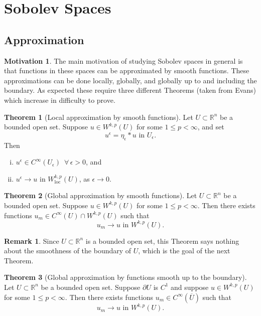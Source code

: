 \documentclass[11pt]{article}
\theoremstyle{definition}
\newtheorem*{theorem}{Theorem}
\newtheorem*{remark}{Remark}
\newtheorem*{motivation}{Motivation}
\begin{document}
\newpage

\section{Sobolev Spaces}

\newpage

\subsection{Approximation}
\begin{motivation}
The main motivation of studying Sobolev spaces in general is that functions in these spaces can be approximated by smooth functions.
These approximations can be done locally, globally, and globally up to and including the boundary.
As expected these require three different Theorems (taken from Evans) which increase in difficulty to prove.
\end{motivation}

\begin{theorem}[Local approximation by smooth functions]
Let $U \subset \mathbb{R}^n$ be a bounded open set. Suppose $u \in W^{k,p}(U)$ for some $1 \leq p < \infty$, and set
	\[u^{\epsilon} = \eta_{\epsilon} * u \text{ in } U_{\epsilon}.\]
Then
	\begin{enumerate}[(i)]
		\item $u^{\epsilon} \in C^{\infty}(U_{\epsilon}) \,\,\, \forall \, \epsilon > 0$, and
		\item $u^{\epsilon} \rightarrow u \text{ in } W_{\text{loc}}^{k,p}(U)$, as $\epsilon \rightarrow 0$.
	\end{enumerate}
\end{theorem}

\begin{theorem}[Global approximation by smooth functions]
	Let $U \subset \mathbb{R}^n$ be a bounded open set. Suppose $u \in W^{k,p}(U)$ for some $1 \leq p < \infty$. Then there exists functions $u_m \in C^{\infty}(U)\cap W^{k,p}(U)$ such that
	\[u_m \rightarrow u \text{ in } W^{k,p}(U).\]
\end{theorem}
\begin{remark}
	Since $U \subset \mathbb{R}^n$ is a bounded open set, this Theorem says
	nothing about the smoothness of the boundary of $U$, which is the goal of the next Theorem.
\end{remark}

\begin{theorem}[Global approximation by functions smooth up to the boundary]
	Let $U \subset \mathbb{R}^n$ be a bounded open set. Suppose $\partial U$ is $C^1$ and suppose $u \in W^{k,p}(U)$ for some $1 \leq p < \infty$.
	Then there exists functions $u_m \in C^{\infty}(\overline{U})$ such that
	\[u_m \rightarrow u \text{ in } W^{k,p}(U).\]
\end{theorem}
\end{document}
